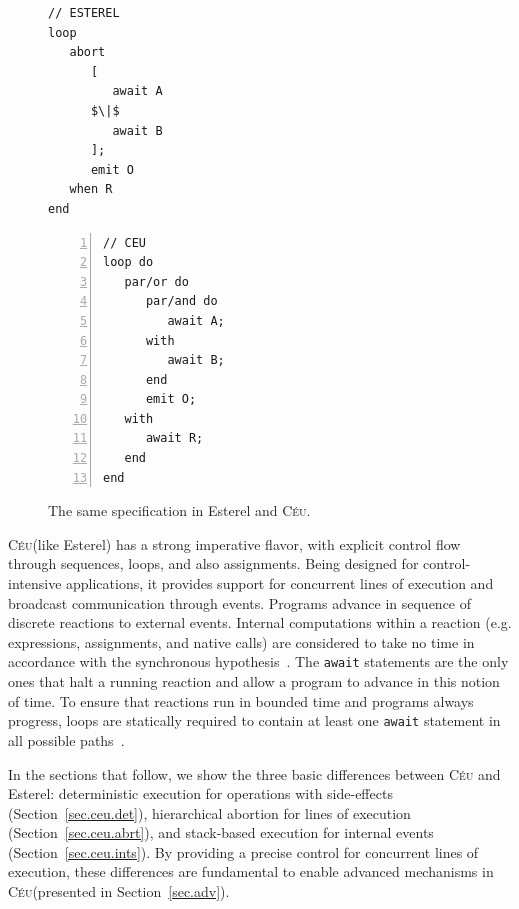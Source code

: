 \documentclass{sigplanconf}
\newcommand{\CEU}{\textsc{C\'{e}u}\xspace}
\newcommand{\code}[1] {{\small{\texttt{#1}}}}
\newcommand{\1}{\;}
\newcommand{\2}{\;\;}
\newcommand{\3}{\;\;\;}
\newcommand{\5}{\;\;\;\;\;}
\begin{document}
\begin{figure}[t]
\begin{minipage}[t]{0.44\linewidth}
\begin{lstlisting}[mathescape=true]
// ESTEREL
loop
   abort
      [
         await A
      $\|$
         await B
      ];
      emit O
   when R
end
\end{lstlisting}
\end{minipage}
%
\begin{minipage}[t]{0.55\linewidth}
\begin{lstlisting}[numbers=left,xleftmargin=3.5em]
// CEU
loop do
   par/or do
      par/and do
         await A;
      with
         await B;
      end
      emit O;
   with
      await R;
   end
end
\end{lstlisting}
\end{minipage}
\caption{ The same specification in Esterel and \CEU. %
{\small
}
\label{lst.abro}
}
\end{figure}

\CEU (like Esterel) has a strong imperative flavor, with explicit control flow 
through sequences, loops, and also assignments.
Being designed for control-intensive applications, it provides support for 
concurrent lines of execution and broadcast communication through events.
%
Programs advance in sequence of discrete reactions to external events.
Internal computations within a reaction (e.g. expressions, assignments, and 
native calls) are considered to take no time in accordance with the synchronous 
hypothesis~\cite{rp.hypothesis}.
The \code{await} statements are the only ones that halt a running reaction and 
allow a program to advance in this notion of time.
%
To ensure that reactions run in bounded time and programs always progress, 
loops are statically required to contain at least one \code{await} statement in 
all possible paths~\cite{ceu.sensys13,esterel.primer}.

In the sections that follow, we show the three basic differences between \CEU 
and Esterel: deterministic execution for operations with side-effects
(Section~\ref{sec.ceu.det}), hierarchical abortion for lines of execution 
(Section~\ref{sec.ceu.abrt}), and stack-based execution for internal events 
(Section~\ref{sec.ceu.ints}).
%
By providing a precise control for concurrent lines of execution, these 
differences are fundamental to enable advanced mechanisms in \CEU (presented in 
Section~\ref{sec.adv}).
\end{document}
